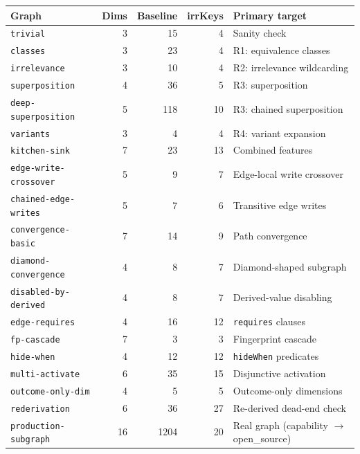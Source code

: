 \documentclass[11pt]{article}
\theoremstyle{definition}
\begin{document}
\begin{center}
\begin{tabular}{lrrrl}
\textbf{Graph} & \textbf{Dims} & \textbf{Baseline} & \textbf{irrKeys}
  & \textbf{Primary target} \\
\hline
\texttt{trivial}             & 3  & 15   & 4  & Sanity check \\
\texttt{classes}             & 3  & 23   & 4  & R1: equivalence classes \\
\texttt{irrelevance}         & 3  & 10   & 4  & R2: irrelevance wildcarding \\
\texttt{superposition}       & 4  & 36   & 5  & R3: superposition \\
\texttt{deep-superposition}  & 5  & 118  & 10 & R3: chained superposition \\
\texttt{variants}            & 3  & 4    & 4  & R4: variant expansion \\
\texttt{kitchen-sink}        & 7  & 23   & 13 & Combined features \\
\texttt{edge-write-crossover} & 5  & 9    & 7  & Edge-local write crossover \\
\texttt{chained-edge-writes}  & 5  & 7    & 6  & Transitive edge writes \\
\texttt{convergence-basic}   & 7  & 14   & 9  & Path convergence \\
\texttt{diamond-convergence} & 4  & 8    & 7  & Diamond-shaped subgraph \\
\texttt{disabled-by-derived} & 4  & 8    & 7  & Derived-value disabling \\
\texttt{edge-requires}       & 4  & 16   & 12 & \texttt{requires} clauses \\
\texttt{fp-cascade}          & 7  & 3    & 3  & Fingerprint cascade \\
\texttt{hide-when}           & 4  & 12   & 12 & \texttt{hideWhen} predicates \\
\texttt{multi-activate}      & 6  & 35   & 15 & Disjunctive activation \\
\texttt{outcome-only-dim}    & 4  & 5    & 5  & Outcome-only dimensions \\
\texttt{rederivation}        & 6  & 36   & 27 & Re-derived dead-end check \\
\texttt{production-subgraph} & 16 & 1204 & 20
  & Real graph (capability $\to$ open\_source) \\
\end{tabular}
\end{center}
\end{document}
